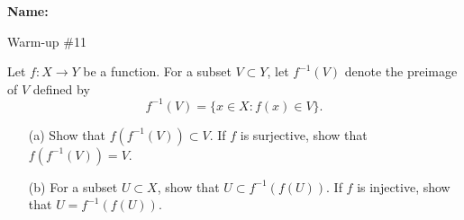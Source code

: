 \documentclass[12pt]{article}
\begin{document}
\noindent \textbf{Name:} 

\begin{center}
Warm-up \#11
\end{center}

\noindent Let $f : X \to Y$ be a function. For a subset $V \subset Y$, let $f^{-1}(V)$ denote the preimage of $V$ defined by 
\[
f^{-1}(V) = \{x \in X : f(x) \in V\}.
\]
\begin{enumerate}
\item[(a)] Show that $f(f^{-1}(V)) \subset V$. If $f$ is surjective, show that $f(f^{-1}(V)) = V$. 
\item[(b)] For a subset $U \subset X$, show that $U \subset f^{-1}(f(U))$. If $f$ is injective, show that $U = f^{-1}(f(U)).$
\end{enumerate}
\end{document}
